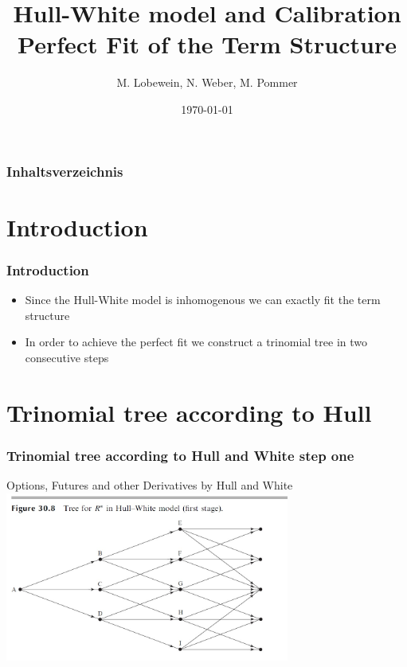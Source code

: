 \documentclass{beamer}
\begin{document}
\title[Hull-White model and calibration]{Hull-White model and Calibration\\
Perfect Fit of the Term Structure}  



\date{\today} 
\author{M. Lobewein, N. Weber, M. Pommer}



\begin{frame}
\titlepage
\end{frame} 


\begin{frame}
\frametitle[Inhaltsverzeichnis]{Inhaltsverzeichnis}
\vspace{0.4cm}
\tableofcontents
\end{frame} 


\section{Introduction} 
\begin{frame}
\frametitle{Introduction} 
\begin{itemize}
\item Since the Hull-White model is inhomogenous we can exactly fit the term structure
\item In order to achieve the perfect fit we construct a trinomial tree in two consecutive steps
\end{itemize}
\end{frame}


\section{Trinomial tree according to Hull} 
\begin{frame}
\frametitle{Trinomial tree according to Hull and White step one} 
\begin{block}{Options, Futures and other Derivatives by Hull and White}
\includegraphics[width=0.7\textwidth]{Trinomialbaum hull White step one}
\end{block}

\end{frame}
\end{document}
